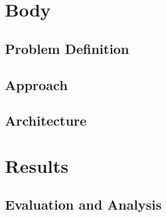 \section{Body}

\subsection{Problem Definition}

\subsection{Approach}

\subsection{Architecture}

\section{Results}

\subsection{Evaluation and Analysis}

